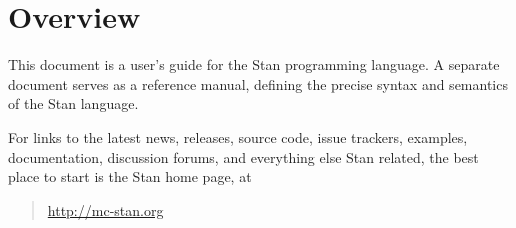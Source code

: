 \chapter{Overview}

\noindent
This document is a user's guide for the Stan programming language.
A separate document serves as a reference manual, defining the precise
syntax and semantics of the Stan language.

For links to the latest news, releases, source code, issue trackers,
examples, documentation, discussion forums, and everything else Stan
related, the best place to start is the Stan home page, at
%
\begin{quote}
\url{http://mc-stan.org}
\end{quote}
